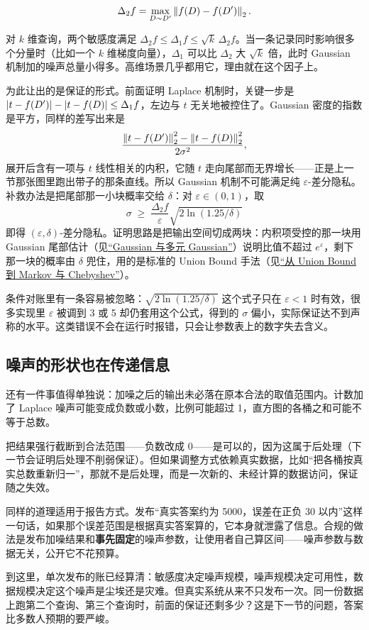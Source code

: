 \[
\Delta_2 f=\max_{D\sim D'}\left\lVert f(D)-f(D')\right\rVert_2 .
\]

对 \(k\) 维查询，两个敏感度满足 \(\Delta_2 f\le\Delta_1 f\le\sqrt k\,\Delta_2 f\)。当一条记录同时影响很多个分量时（比如一个 \(k\) 维梯度向量），\(\Delta_1\) 可以比 \(\Delta_2\) 大 \(\sqrt k\) 倍，此时 Gaussian 机制加的噪声总量小得多。高维场景几乎都用它，理由就在这个因子上。

为此让出的是保证的形式。前面证明 Laplace 机制时，关键一步是 \(\left|t-f(D')\right|-\left|t-f(D)\right|\le\Delta_1 f\)，左边与 \(t\) 无关地被控住了。Gaussian 密度的指数是平方，同样的差写出来是
\[
\frac{\left\lVert t-f(D')\right\rVert_2^2-\left\lVert t-f(D)\right\rVert_2^2}{2\sigma^2},
\]
展开后含有一项与 \(t\) 线性相关的内积，它随 \(t\) 走向尾部而无界增长——正是上一节那张图里跑出带子的那条直线。所以 Gaussian 机制不可能满足纯 \(\varepsilon\)-差分隐私。补救办法是把尾部那一小块概率交给 \(\delta\)：对 \(\varepsilon\in(0,1)\)，取
\[
\sigma\;\ge\;\frac{\Delta_2 f}{\varepsilon}\sqrt{2\ln(1.25/\delta)}
\]
即得 \((\varepsilon,\delta)\)-差分隐私。证明思路是把输出空间切成两块：内积项受控的那一块用 Gaussian 尾部估计（见\hyperref[sec:05-Probability/06-Common-Distributions/05]{``Gaussian 与多元 Gaussian''}）说明比值不超过 \(e^\varepsilon\)，剩下那一块的概率由 \(\delta\) 兜住，用的是标准的 Union Bound 手法（见\hyperref[sec:05-Probability/07-Transforms-and-Bounds/02]{``从 Union Bound 到 Markov 与 Chebyshev''}）。

条件对账里有一条容易被忽略：\(\sqrt{2\ln(1.25/\delta)}\) 这个式子只在 \(\varepsilon<1\) 时有效，很多实现里 \(\varepsilon\) 被调到 3 或 5 却仍套用这个公式，得到的 \(\sigma\) 偏小，实际保证达不到声称的水平。这类错误不会在运行时报错，只会让参数表上的数字失去含义。

\subsection{噪声的形状也在传递信息}

还有一件事值得单独说：加噪之后的输出未必落在原本合法的取值范围内。计数加了 Laplace 噪声可能变成负数或小数，比例可能超过 1，直方图的各桶之和可能不等于总数。

把结果强行截断到合法范围——负数改成 0——是可以的，因为这属于后处理（下一节会证明后处理不削弱保证）。但如果调整方式依赖真实数据，比如``把各桶按真实总数重新归一''，那就不是后处理，而是一次新的、未经计算的数据访问，保证随之失效。

同样的道理适用于报告方式。发布``真实答案约为 5000，误差在正负 30 以内''这样一句话，如果那个误差范围是根据真实答案算的，它本身就泄露了信息。合规的做法是发布加噪结果和\textbf{事先固定}的噪声参数，让使用者自己算区间——噪声参数与数据无关，公开它不花预算。

到这里，单次发布的账已经算清：敏感度决定噪声规模，噪声规模决定可用性，数据规模决定这个噪声是尘埃还是灾难。但真实系统从来不只发布一次。同一份数据上跑第二个查询、第三个查询时，前面的保证还剩多少？这是下一节的问题，答案比多数人预期的要严峻。
